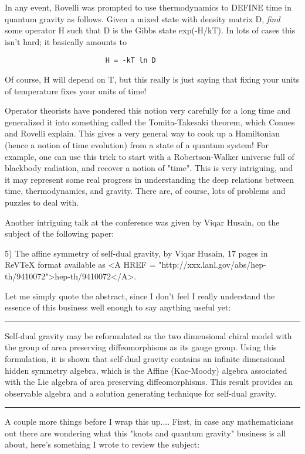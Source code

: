 In any event, Rovelli was prompted to use thermodynamics to DEFINE time
in quantum gravity as follows.  Given a mixed state with density matrix
D, \emph{find} some operator H such that D is the Gibbs state exp(-H/kT).
In lots of cases this isn't hard; it basically amounts to 

\begin{verbatim}
                        H = -kT ln D
\end{verbatim}
    

Of course, H will depend on T, but this really is just saying that
fixing your units of temperature fixes your units of time!

Operator theorists have pondered this notion very carefully for a long
time and generalized it into something called the Tomita-Takesaki
theorem, which Connes and Rovelli explain.  This gives a very general
way to cook up a Hamiltonian (hence a notion of time evolution) from a
state of a quantum system!  For example, one can use this trick to start
with a Robertson-Walker universe full of blackbody radiation, and
recover a notion of "time".  This is very intriguing, and it may
represent some real progress in understanding the deep relations between
time, thermodynamics, and gravity.  There are, of course, lots of
problems and puzzles to deal with.  

Another intriguing talk at the conference was given by Viqar Husain, on
the subject of the following paper:

5) The affine symmetry of self-dual gravity, by Viqar Husain, 17 pages
in ReVTeX format available as <A HREF = "http://xxx.lanl.gov/abs/hep-th/9410072">hep-th/9410072</A>.  

Let me simply quote the abstract, since I don't feel I really understand
the essence of this business well enough to say anything useful yet:

\par\noindent\rule{\textwidth}{0.4pt}
Self-dual gravity may be reformulated as the two dimensional chiral
model with the group of area preserving diffeomorphisms as its gauge
group.  Using this formulation, it is shown that self-dual gravity
contains an infinite dimensional hidden symmetry algebra, which is the
Affine (Kac-Moody) algebra associated with the Lie algebra of area
preserving diffeomorphisms.  This result provides an observable algebra
and a solution generating technique for self-dual gravity.
\par\noindent\rule{\textwidth}{0.4pt}

A couple more things before I wrap this up....  First, in case any
mathematicians out there are wondering what this "knots and quantum
gravity" business is all about, here's something I wrote to review the
subject: 

